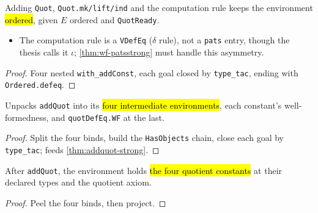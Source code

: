 \begin{lemma}
\label{thm:addquot-wf}
\leanok
{}

 Adding \texttt{Quot}, \texttt{Quot.mk/lift/ind} and the computation rule
keeps the environment \hl{ordered}, given $E$ ordered and \texttt{QuotReady}.
\begin{itemize}
\item {} The computation rule is a \texttt{VDefEq} ($\delta$ rule), not a
  \texttt{pats} entry, though the thesis calls it $\iota$; \ref{thm:wf-patsstrong} must
  handle this asymmetry.
\end{itemize}
\end{lemma}
\begin{proof}
\leanok
{} Four nested \texttt{with\_addConst}, each goal closed by \texttt{type\_tac},
ending with \texttt{Ordered.defeq}.
\end{proof}

\begin{lemma}
\label{thm:addquot-chain}
\leanok
{}

 Unpacks \texttt{addQuot} into its \hl{four intermediate environments}, each
constant's well-formedness, and \texttt{quotDefEq.WF} at the last.
\end{lemma}
\begin{proof}
\leanok
{} Split the four binds, build the \texttt{HasObjects} chain, close each goal by
\texttt{type\_tac}; feeds \ref{thm:addquot-strong}.
\end{proof}

\begin{lemma}
\label{fam:addquot-objs}
\leanok
{}

 After \texttt{addQuot}, the environment holds \hl{the four quotient
constants} at their declared types and the quotient axiom.
\end{lemma}
\begin{proof}
\leanok
{} Peel the four binds, then project.
\end{proof}

